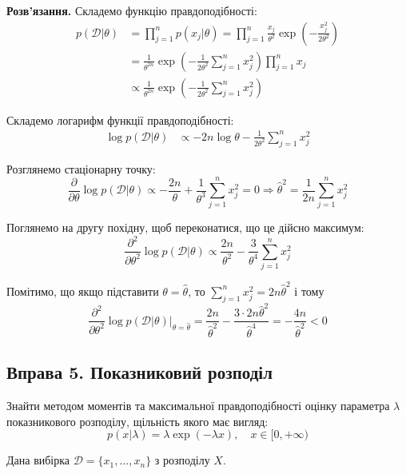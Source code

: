 \documentclass{hw_template}
\begin{document}
\textbf{Розв'язання.} Складемо функцію правдоподібності:
\begin{align*}
    p(\mathcal{D} | \theta) &= \prod_{j=1}^n p(x_j | \theta) = \prod_{j=1}^n \frac{x_j}{\theta^2}\exp\left(-\frac{x_j^2}{2\theta^2}\right) \\
    &= \frac{1}{\theta^{2n}}\exp\left(-\frac{1}{2\theta^2}\sum_{j=1}^n x_j^2\right)\prod_{j=1}^n x_j \\
    &\propto \frac{1}{\theta^{2n}}\exp\left(-\frac{1}{2\theta^2}\sum_{j=1}^n x_j^2\right)
\end{align*}

Складемо логарифм функції правдоподібності:
\begin{align*}
    \log p(\mathcal{D} | \theta) &\propto -2n\log\theta - \frac{1}{2\theta^2}\sum_{j=1}^n x_j^2
\end{align*}

Розглянемо стаціонарну точку:
\begin{equation*}
    \frac{\partial}{\partial \theta} \log p(\mathcal{D} | \theta) \propto -\frac{2n}{\theta} + \frac{1}{\theta^3}\sum_{j=1}^n x_j^2 = 0 \Rightarrow \boxed{\hat{\theta}^2 = \frac{1}{2n}\sum_{j=1}^n x_j^2}
\end{equation*}

Поглянемо на другу похідну, щоб переконатися, що це дійсно максимум:
\begin{equation*}
    \frac{\partial^2}{\partial \theta^2} \log p(\mathcal{D} | \theta) \propto \frac{2n}{\theta^2} - \frac{3}{\theta^4}\sum_{j=1}^n x_j^2 
\end{equation*}

Помітимо, що якщо підставити $\theta = \hat{\theta}$, то $\sum_{j=1}^n x_j^2 = 2n\hat{\theta}^2$ і тому
\begin{equation*}
    \frac{\partial^2}{\partial\theta^2}\log p(\mathcal{D} | \theta)\Big|_{\theta = \hat{\theta}} = \frac{2n}{\hat{\theta}^2} - \frac{3 \cdot 2n\hat{\theta}^2}{\hat{\theta}^4} = -\frac{4n}{\hat{\theta}^2} < 0
\end{equation*}

\pagebreak

\subsection{Вправа 5. Показниковий розподіл}

\begin{problem}
    Знайти методом моментів та максимальної правдоподібності оцінку параметра $\lambda$ показникового розподілу, щільність якого має вигляд:
    \begin{equation*}
        p(x|\lambda) = \lambda\exp(-\lambda x), \quad x \in [0,+\infty)
    \end{equation*}

    Дана вибірка $\mathcal{D} = \{x_1,\dots,x_n\}$ з розподілу $X$.
\end{problem}
\end{document}
